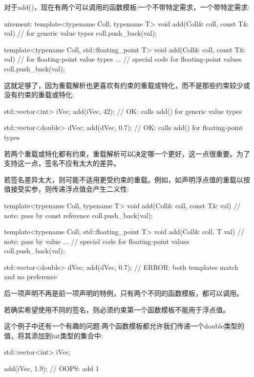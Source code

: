 对于add()，现在有两个可以调用的函数模板:一个不带特定需求，一个带特定需求:

\begin{cpp}
uirement:
template<typename Coll, typename T>
void add(Coll& coll, const T& val) // for generic value types
{
	coll.push_back(val);
}

template<typename Coll, std::floating_point T>
void add(Coll& coll, const T& val) // for floating-point value types
{
	... // special code for floating-point values
	coll.push_back(val);
}
\end{cpp}

这就足够了，因为重载解析也更喜欢有约束的重载或特化，而不是那些约束较少或没有约束的重载或特化:

\begin{cpp}
std::vector<int> iVec;
add(iVec, 42); // OK: calls add() for generic value types

std::vector<double> dVec;
add(dVec, 0.7); // OK: calls add() for floating-point types
\end{cpp}


若两个重载或特化都有约束，重载解析可以决定哪一个更好，这一点很重要。为了支持这一点，签名不应有太大的差异。

若签名差异太大，则可能不适用更受约束的重载。例如，如声明浮点值的重载以按值接受实参，则传递浮点值会产生二义性:

\begin{cpp}
template<typename Coll, typename T>
void add(Coll& coll, const T& val) // note: pass by const reference
{
	coll.push_back(val);
}

template<typename Coll, std::floating_point T>
void add(Coll& coll, T val) // note: pass by value
{
	... // special code for floating-point values
	coll.push_back(val);
}

std::vector<double> dVec;
add(dVec, 0.7); // ERROR: both templates match and no preference
\end{cpp}

后一项声明不再是前一项声明的特例，只有两个不同的函数模板，都可以调用。

若确实希望使用不同的签名，则必须约束第一个函数模板不能用于浮点值。


这个例子中还有一个有趣的问题:两个函数模板都允许我们传递一个double类型的值，将其添加到int类型的集合中:

\begin{cpp}
std::vector<int> iVec;

add(iVec, 1.9); // OOPS: add 1
\end{cpp}

